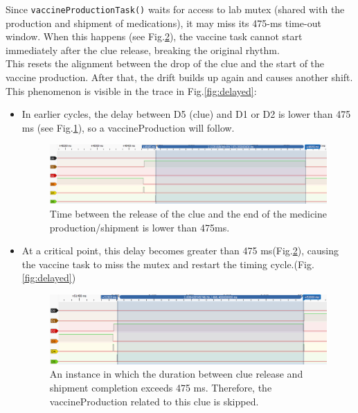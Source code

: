 \documentclass[a4paper, twoside, 12pt]{article}
\begin{document}
Since \texttt{vaccineProductionTask()} waits for access to lab mutex (shared with the production and shipment of medications), it may miss its 475-ms time-out window. When this happens (see Fig.\ref{fig:greater_than_475ms}), the vaccine task cannot start immediately after the clue release, breaking the original rhythm.\\
This resets the alignment between the drop of the clue and the start of the vaccine production. After that, the drift builds up again and causes another shift.
This phenomenon is visible in the trace in Fig.\ref{fig:delayed}:
\begin{itemize}
	\setlength\itemsep{0em}
	\item In earlier cycles, the delay between D5 (clue) and D1 or D2 is lower than 475 ms (see Fig.\ref{fig:lower_than_475ms}), so a vaccineProduction will follow.
	      \begin{figure}[ht!]
		      \centering
		      \includegraphics[width=1.05\linewidth]{../run_pulseview/lower_than_475_ms.png}
		      \caption{Time between the release of the clue and the end of the medicine production/shipment is lower than 475ms.}
		      \label{fig:lower_than_475ms}
	      \end{figure}

	\item At a critical point, this delay becomes greater than 475 ms(Fig.\ref{fig:greater_than_475ms}), causing the vaccine task to miss the mutex and restart the timing cycle.(Fig.\ref{fig:delayed})

	      \begin{figure}[ht!]
		      \centering
		      \includegraphics[width=1.05\linewidth]{../run_pulseview/greater_than_475_ms.png}
		      \caption{An instance in which the duration between clue release and shipment completion exceeds 475 ms. Therefore, the vaccineProduction related to this clue is skipped.}
		      \label{fig:greater_than_475ms}
	      \end{figure}
\end{itemize}
\end{document}
